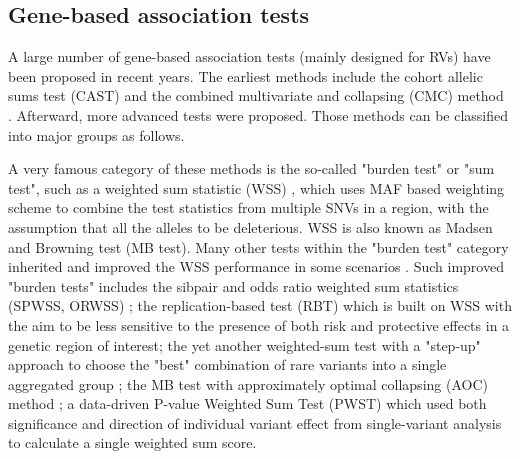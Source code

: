 \documentclass[12pt]{article}
\begin{document}
\subsection{Gene-based association tests}\label{sec:bg:Gb test}
A large number of gene-based association tests (mainly designed for RVs) have been proposed in recent years. The earliest methods include the cohort allelic sums test (CAST)\cite{Morgenthaler2007} and the combined multivariate and collapsing (CMC) method \cite{Li2008}. Afterward, more advanced tests were proposed. Those methods can be classified into major groups as follows.

A very famous category of these methods is the so-called "burden test" or "sum test", such as a weighted sum statistic (WSS) \cite{Madsen2009}, which uses MAF based weighting scheme to combine the test statistics from multiple SNVs in a region, with the assumption that all the alleles to be deleterious. WSS is also known as Madsen and Browning test (MB test). Many other tests within the "burden test" category inherited and improved the WSS performance in some scenarios \cite{Hoffmann2010,Zhang2010,Ionita-Laza2011,Feng2011}. Such improved "burden tests" includes the sibpair and odds ratio weighted sum statistics (SPWSS, ORWSS) \cite{Zhu2010,Feng2011}; the replication-based test (RBT) \cite{Ionita-Laza2011} which is built on WSS with the aim to be less sensitive to the presence of both risk and protective effects in a genetic region of interest; the yet another weighted-sum test with a "step-up" approach to choose the "best" combination of rare variants into a single aggregated group \cite{Hoffmann2010}; the MB test with approximately optimal collapsing (AOC) method \cite{Zhang2010}; a data-driven P-value Weighted Sum Test (PWST) \cite{Zhang2011} which used both significance and direction of individual variant effect from single-variant analysis to calculate a single weighted sum score.
\end{document}
